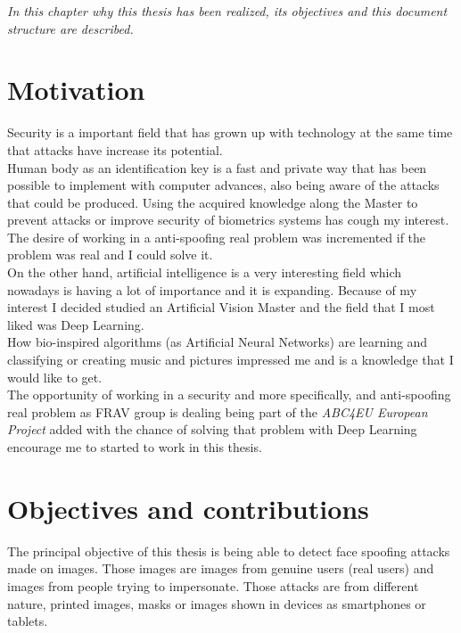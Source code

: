 \minitoc
\mtcskip

\begin{small}
\emph{In this chapter why this thesis has been realized, its objectives and this document structure are described.\\}
\end{small}
\section{Motivation}
Security is a important field that has grown up with technology at the same time that attacks have increase its potential.\\

Human body as an identification key is a fast and private way that has been possible to implement with computer advances, also being aware of the attacks that could be produced. Using the acquired knowledge along the Master to prevent attacks or improve security of biometrics systems has cough my interest.\\

The desire of working in a anti-spoofing real problem was incremented if the problem was real and I could solve it.\\

On the other hand, artificial intelligence is a very interesting field which nowadays is having a lot of importance and it is expanding. Because of my interest I decided studied an Artificial Vision Master and the field that I most liked was Deep Learning.\\

How bio-inspired algorithms (as Artificial Neural Networks) are learning and classifying or creating music and pictures impressed me and is a knowledge that I would like to get.\\

The opportunity of working in a security and more specifically, and anti-spoofing real problem as FRAV group is dealing being part of the \textit{ABC4EU European Project} added with the chance of solving that problem with Deep Learning encourage me to started to work in this thesis.\\

\section{Objectives and contributions}
The principal objective of this thesis is being able to detect face spoofing attacks made on images. Those images are images from genuine users (real users) and images from people trying to impersonate. Those attacks are from different nature, printed images, masks or images shown in devices as smartphones or tablets.\\

